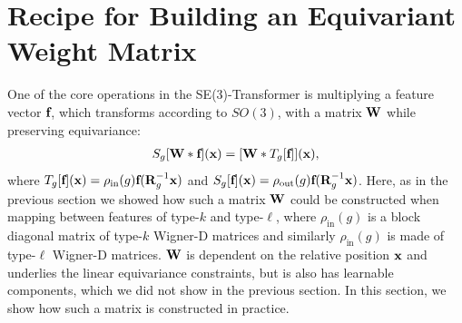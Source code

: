 \section{Recipe for Building an Equivariant Weight Matrix}
One of the core operations in the SE(3)-Transformer is multiplying a feature vector $\textbf{f}$, which transforms according to $SO(3)$, with a matrix $\textbf{W}$ while preserving equivariance:
\begin{align}
S_g[\textbf{W} * \textbf{f}](\textbf{x}) = [\textbf{W} * T_g[\textbf{f}]](\textbf{x}),
\end{align}
where $T_g[\textbf{f}](\textbf{x}) = \rho_\text{in}(g)\textbf{f}(\textbf{R}_g^{-1}\textbf{x})$ and $S_g[\textbf{f}](\textbf{x}) = \rho_\text{out}(g)\textbf{f}(\textbf{R}_g^{-1}\textbf{x})$. Here, as in the previous section we showed how such a matrix $\textbf{W}$ could be constructed when mapping between features of type-$k$ and type-$\ell$, where $\rho_\text{in}(g)$ is a block diagonal matrix of type-$k$ Wigner-D matrices and similarly $\rho_\text{in}(g)$ is made of type-$\ell$ Wigner-D matrices. $\textbf{W}$ is dependent on the relative position $\textbf{x}$ and underlies the linear equivariance constraints, but is also has learnable components, which we did not show in the previous section. In this section, we show how such a matrix is constructed in practice.

